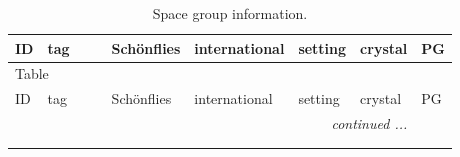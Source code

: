 \documentclass[fleqn,10pt]{jsarticle}
\begin{document}
\setcounter{MaxMatrixCols}{32}

\renewcommand{\tablename}{Table~}
\renewcommand{\figurename}{Figure~}
\begin{center}
\renewcommand{\arraystretch}{1.0}
\begin{longtable}{lllllllll}
\caption{Space group information.}
 \\
 \hline \hline
ID & tag &  &  & Sch\"onflies & international & setting & crystal & PG \\ \hline \endfirsthead

\multicolumn{8}{l}{\tablename\ \thetable{}} \\
 \hline \hline
ID & tag &  &  & Sch\"onflies & international & setting & crystal & PG \\ \hline \endhead

 \hline \hline
\multicolumn{8}{r}{\footnotesize\it continued ...} \\ \endfoot

 \hline \hline
\multicolumn{8}{r}{} \\ \endlastfoot


\end{longtable}
\end{center}
\end{document}
